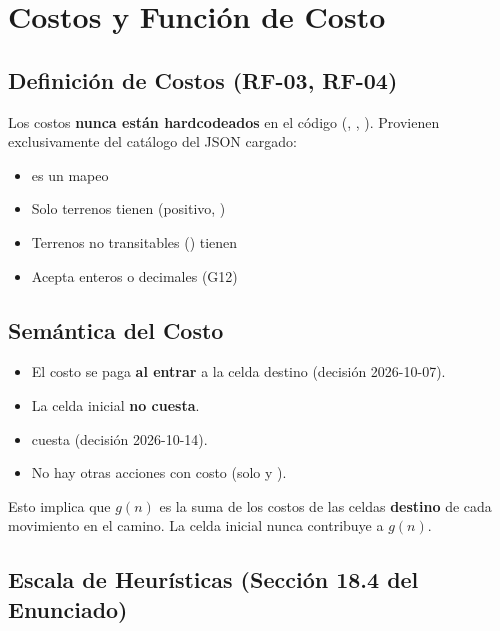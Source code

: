 \chapter{Costos y Función de Costo}
\label{ch:costos}

\section{Definición de Costos (RF-03, RF-04)}
\label{sec:definicion-costos}

Los costos \textbf{nunca están hardcodeados} en el código (, , ). Provienen
exclusivamente del catálogo  del JSON cargado:

\begin{itemize}
\item {} es un mapeo 
\item Solo terrenos  tienen  (positivo, )
\item Terrenos no transitables () tienen 
\item Acepta enteros o decimales (G12)
\end{itemize}

\section{Semántica del Costo}
\label{sec:semantica-costo}

\begin{itemize}
\item El costo se paga \textbf{al entrar} a la celda destino (decisión 2026-10-07).
\item La celda inicial \textbf{no cuesta}.
\item {} cuesta  (decisión 2026-10-14).
\item No hay otras acciones con costo (solo  y ).
\end{itemize}

Esto implica que $g(n)$ es la suma de los costos de las celdas \textbf{destino} de cada movimiento
en el camino. La celda inicial nunca contribuye a $g(n)$.

\section{Escala de Heurísticas (Sección 18.4 del Enunciado)}
\label{sec:escala-heuristicas}

